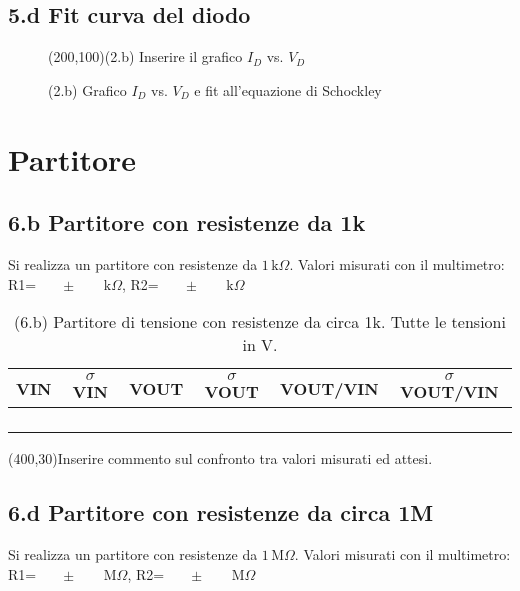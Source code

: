 \documentclass[10pt,a4paper]{article}
\newcommand{\exn}{\phantom{xxx}}
\begin{document}
\subsection*{5.d Fit curva del diodo}
\par

\begin{figure}[h]
\centering
\framebox(200,100){(2.b) Inserire il grafico $I_{D}$ vs. $V_{D}$ }
\caption{(2.b) Grafico $I_{D}$ vs. $V_{D}$ e fit all'equazione di Schockley}
\end{figure}







\section{Partitore}

\subsection*{6.b Partitore con resistenze da 1k}


Si realizza un partitore con resistenze da $1 \,\mathrm{k}\Omega$. Valori misurati con il multimetro: R1=$\exn \pm \exn \,\mathrm{k}\Omega$, R2=$\exn \pm \exn \,\mathrm{k}\Omega$


\begin{table}[h]
\centering
\begin{tabular}{|c|c|c|c|c|c|}
\hline 
VIN& $\sigma$ VIN  &VOUT	 & $\sigma$ VOUT& VOUT/VIN & $\sigma$ VOUT/VIN \\
\hline 
\exn & \exn & \exn & \exn & \exn &\exn \\
\exn & \exn & \exn & \exn & \exn &\exn \\
\exn & \exn & \exn & \exn & \exn &\exn \\
\exn & \exn & \exn & \exn & \exn &\exn \\
\hline 
\end{tabular} 
\caption{(6.b) Partitore di tensione con resistenze da circa 1k. Tutte le tensioni in V.\label{t:par1}}
\end{table}


\framebox(400,30){Inserire commento sul confronto tra valori misurati ed attesi.}


\subsection*{6.d Partitore con resistenze da circa 1M}
\par
Si realizza un partitore con resistenze da $1 \,\mathrm{M}\Omega$. Valori misurati con il multimetro: R1=$\exn \pm \exn \,\mathrm{M}\Omega$, R2=$\exn \pm \exn \,\mathrm{M}\Omega$
\end{document}
